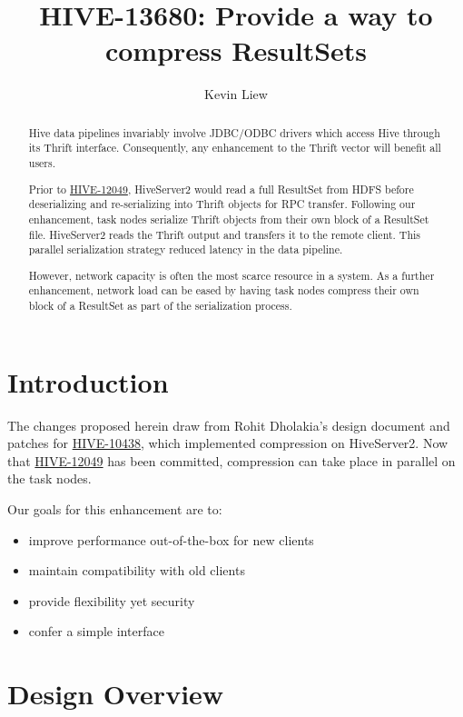 \documentclass[11pt,a4paper]{article}
\title{HIVE-13680: Provide a way to compress ResultSets}
\author{Kevin Liew}
\begin{document}
\maketitle

\begin{abstract}
	Hive data pipelines invariably involve JDBC/ODBC drivers which access Hive through its Thrift interface. 
	Consequently, any enhancement to the Thrift vector will benefit all users.
	
	Prior to 
	\href{https://issues.apache.org/jira/browse/HIVE-12049}{HIVE-12049},
	HiveServer2 would read a full ResultSet from HDFS before deserializing and re-serializing into Thrift objects for RPC transfer.
	Following our enhancement, task nodes serialize Thrift objects from their own block of a ResultSet file. 
	HiveServer2 reads the Thrift output and transfers it to the remote client. 
	This parallel serialization strategy reduced latency in the data pipeline.
	
	However, network capacity is often the most scarce resource in a system. 
	As a further enhancement, network load can be eased by having task nodes compress their own block of a ResultSet as part of the serialization process.
\end{abstract}

\section{Introduction}
	The changes proposed herein draw from Rohit Dholakia's design document and patches for
	\href{https://issues.apache.org/jira/browse/HIVE-10438}{HIVE-10438}, which implemented compression on HiveServer2.
	Now that
	\href{https://issues.apache.org/jira/browse/HIVE-12049}{HIVE-12049}
	has been committed, compression can take place in parallel on the task nodes.
	
	Our goals for this enhancement are to:
	\begin{itemize}
		\item improve performance out-of-the-box for new clients
		\item maintain compatibility with old clients
		\item provide flexibility yet security
		\item confer a simple interface
	\end{itemize}
	
\section{Design Overview}
\end{document}
